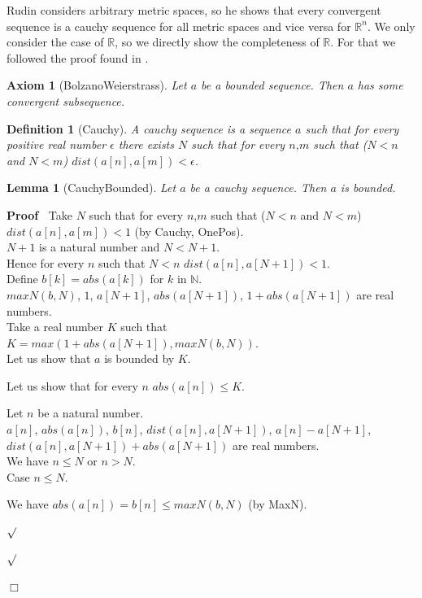 \documentclass{article}
\newenvironment{forthel}{\begin{leftbar}}{\end{leftbar}}
\newenvironment{proof}{\noindent\textbf{Proof\ }}{\hspace*{\fill}$\Box$\medskip}
\newenvironment{subproof}{\begin{list}{}{}
		\item[\text{Proof}]}{\hfill $\surd$ \end{list}}
\newenvironment{case}{\begin{list}{}{}
		\item[]}{\end{list}}
\newtheorem{axiom}{Axiom}
\newtheorem{lemma}{Lemma}
\newtheorem{definition}{Definition}
\newcommand{\RR}{\mathbb{R}}
\newcommand{\NN}{\mathbb{N}}
\begin{document}
\noindent Rudin considers arbitrary metric spaces, so he shows that every convergent sequence is a cauchy sequence for all metric spaces and vice versa for $\RR^{n}$. We only consider the case of $\RR$, so we directly show the completeness of $\RR$. For that we followed the proof found in \cite{Cauchy}.

\begin{forthel}
	\begin{axiom}[BolzanoWeierstrass]
		Let $a$ be a bounded sequence. Then $a$ has some convergent subsequence. 
	\end{axiom}
	
	\begin{definition}[Cauchy]
		A cauchy sequence is a sequence $a$ such that for every positive real number $\epsilon$ there exists $N$ such that
		for every $n$,$m$ such that ($N < n$ and $N < m$) $dist(a[n],a[m]) < \epsilon$.
	\end{definition}
	
	\begin{lemma}[CauchyBounded]
		Let $a$ be a cauchy sequence. Then $a$ is bounded.
	\end{lemma}
	\begin{proof}
		Take $N$ such that for every $n$,$m$ such that ($N < n$ and $N < m$) $dist(a[n],a[m]) < 1$ (by Cauchy, OnePos). \\
		$N + 1$ is a natural number and $N < N + 1$.\\
		Hence for every $n$ such that $N < n$ $dist(a[n],a[N + 1]) < 1$.\\
		Define $b[k] = abs(a[k])$ for $k$ in $\NN$.\\
		$maxN(b,N)$, $1$, $a[N + 1]$, $abs(a[N + 1])$, $1 + abs(a[N + 1])$ are real numbers.\\
		Take a real number $K$ such that $K = max(1 + abs(a[N + 1]), maxN(b,N))$.\\
		
		\noindent Let us show that $a$ is bounded by $K$.		
		\begin{subproof}
			Let us show that for every $n$ $abs(a[n]) \leq K$. 
			\begin{subproof}
				Let $n$ be a natural number.\\				
				$a[n]$, $abs(a[n])$, $b[n]$, $dist(a[n],a[N + 1])$, $a[n] - a[N + 1]$, $dist(a[n],a[N + 1]) + abs(a[N + 1])$ are real numbers.\\
				We have $n \leq N$ or $n > N$.\\
				Case $n \leq N$.
				\begin{case}
					We have $abs(a[n]) = b[n] \leq maxN(b,N)$ (by MaxN).
					

\end{case}
\end{subproof}
\end{subproof}
\end{proof}
\end{forthel}
\end{document}
